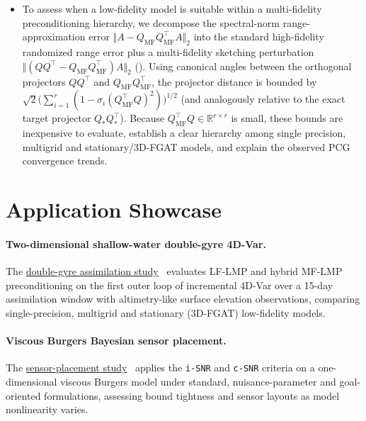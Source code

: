 \begin{itemize}
\item[T4.5] To assess when a low-fidelity model is suitable within a
  multi-fidelity preconditioning hierarchy, we decompose the spectral-norm
  range-approximation error $\Vert A - Q_{\mathrm{MF}} Q_{\mathrm{MF}}^\top A\Vert_2$
  into the standard high-fidelity randomized range error plus a multi-fidelity
  sketching perturbation $\Vert(Q Q^\top - Q_{\mathrm{MF}} Q_{\mathrm{MF}}^\top) A\Vert_2$
  (). Using canonical angles between the orthogonal
  projectors $Q Q^\top$ and $Q_{\mathrm{MF}} Q_{\mathrm{MF}}^\top$, the projector
  distance is bounded by
  $\sqrt{2}\big(\sum_{i=1}^r (1 - \sigma_i(Q_{\mathrm{MF}}^\top Q)^2)\big)^{1/2}$
  (and analogously relative to the exact target projector $Q_* Q_*^\top$).
  Because $Q_{\mathrm{MF}}^\top Q \in \mathbb{R}^{r \times r}$ is small, these
  bounds are inexpensive to evaluate, establish a clear hierarchy among single
  precision, multigrid and stationary/3D-FGAT models, and explain the observed
  PCG convergence trends.

\end{itemize}

\section{Application Showcase}
\label{sec:wp4:applications}

\paragraph{Two-dimensional shallow-water double-gyre 4D-Var.}
The \hyperref[sec:wp4:double-gyre]{double-gyre assimilation study}~\cite{hal-05874752}
evaluates LF-LMP and hybrid MF-LMP preconditioning on the first outer loop of
incremental 4D-Var over a 15-day assimilation window with altimetry-like surface
elevation observations, comparing single-precision, multigrid and stationary
(3D-FGAT) low-fidelity models.

\paragraph{Viscous Burgers Bayesian sensor placement.}
The \hyperref[sec:wp4:sensor-placement]{sensor-placement study}~\cite{hal-05768497}
applies the \texttt{i-SNR} and \texttt{c-SNR} criteria on a one-dimensional
viscous Burgers model under standard, nuisance-parameter and goal-oriented
formulations, assessing bound tightness and sensor layouts as model nonlinearity
varies.


